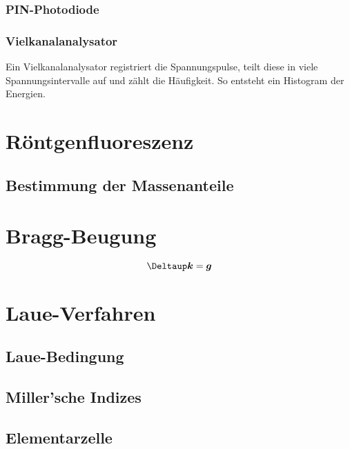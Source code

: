 \subsubsection{PIN-Photodiode}

\parencite[Abschnitt~„Photodiode“]{wikipedia/pin-Diode}

\subsubsection{Vielkanalanalysator}

Ein Vielkanalanalysator registriert die Spannungspulse, teilt diese in viele
Spannungsintervalle auf und zählt die Häufigkeit.
\parencite{Phywe/Vierkanalanalysator} So entsteht ein Histogram der Energien.
\parencite{wikipedia/Vielkanalanalysator}

\section{Röntgenfluoreszenz}

\subsection{Bestimmung der Massenanteile}

\parencite[„Massenanteilsbestimmung“]{physik412-Anleitung}

\section{Bragg-Beugung}

\parencite[(18.4)]{meschede-gerthsen_24}
\[
    \Deltaup \vec k = \vec g
\]

\section{Laue-Verfahren}

\parencite[P428.5.3, „Auswertung“]{physik412-Anleitung}

\subsection{Laue-Bedingung}

\subsection{Miller'sche Indizes}

\subsection{Elementarzelle}

